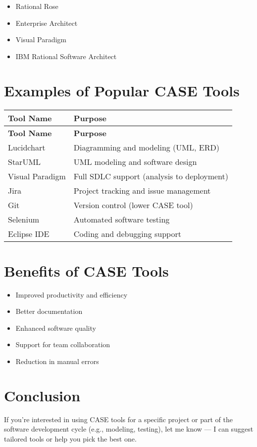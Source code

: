 \documentclass[aspectratio=169]{beamer}
\begin{document}
\begin{itemize}
    \item Rational Rose
    \item Enterprise Architect
    \item Visual Paradigm
    \item IBM Rational Software Architect
\end{itemize}

\section*{Examples of Popular CASE Tools}

\begin{longtable}{|l|l|}
\hline
\textbf{Tool Name} & \textbf{Purpose} \\
\hline
\endfirsthead
\hline
\textbf{Tool Name} & \textbf{Purpose} \\
\hline
\endhead
Lucidchart & Diagramming and modeling (UML, ERD) \\
StarUML & UML modeling and software design \\
Visual Paradigm & Full SDLC support (analysis to deployment) \\
Jira & Project tracking and issue management \\
Git & Version control (lower CASE tool) \\
Selenium & Automated software testing \\
Eclipse IDE & Coding and debugging support \\
\hline
\end{longtable}

\section*{Benefits of CASE Tools}

\begin{itemize}
    \item Improved productivity and efficiency
    \item Better documentation
    \item Enhanced software quality
    \item Support for team collaboration
    \item Reduction in manual errors
\end{itemize}

\section*{Conclusion}
If you're interested in using CASE tools for a specific project or part of the software development cycle (e.g., modeling, testing), let me know — I can suggest tailored tools or help you pick the best one.
\end{document}
